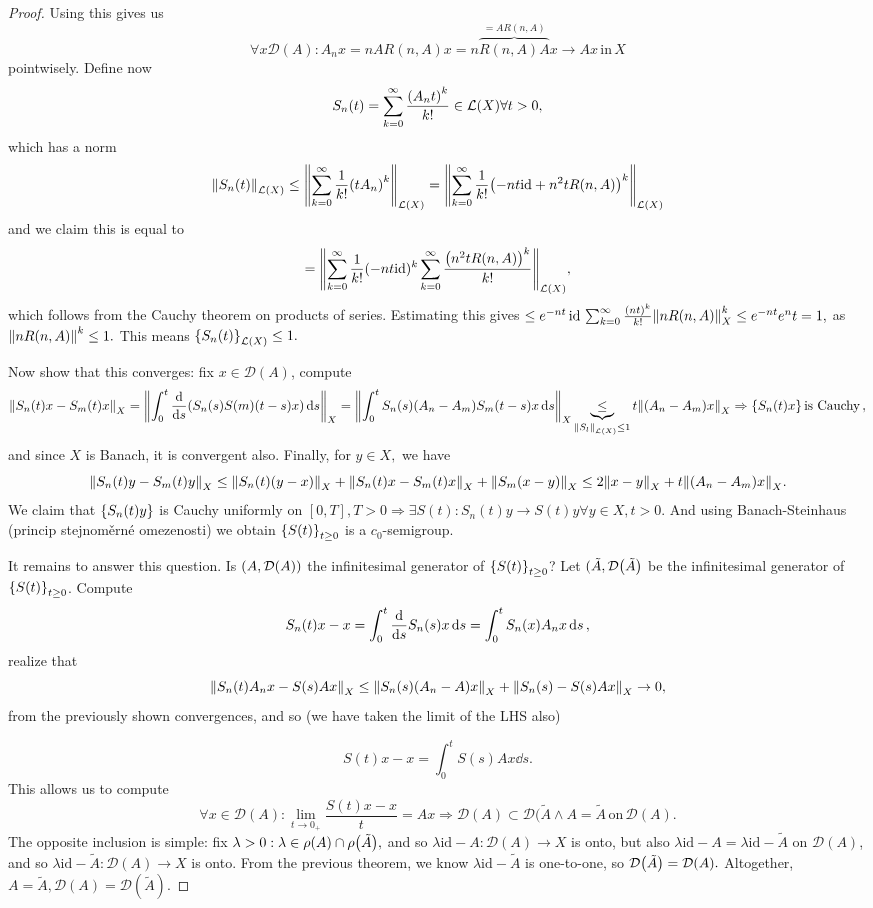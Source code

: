 \documentclass{article}
\begin{document}
\begin{proof}
Using this gives us
\[
	\forall x \mathcal{D}(A): A_n x = n AR(n,A)x = n \overbrace{R(n,A)A}^{=AR(n,A)}x \to Ax \, \text{in} \,X
\]
pointwisely. Define now
\[
	S_n(t) = \sum_{k=0}^{\infty}\frac{\qty(A_n t)^k}{k!} \in \mathcal{L}(X) \forall t>0,
\]
which has a norm
\[
	\norm{S_n(t)}_{\mathcal{L}(X)} \leq \norm{\sum_{k=0}^{\infty}\frac{1}{k!}\qty(tA_n)^k}_{\mathcal{L}(X)} = \norm{\sum_{k=0}^{\infty} \frac{1}{k!}\qty(-n t \text{id} + n^{2} t R(n,A))^k}_{\mathcal{L}(X)}
\]
and we claim this is equal to
\[
	= \norm{\sum_{k=0}^{\infty}\frac{1}{k!}(-n t \text{id})^k \sum_{k=0}^\infty \frac{\qty(n^{2} t R(n,A))^k}{k!}}_{\mathcal{L}(X)},
\]
which follows from the Cauchy theorem on products of series. Estimating this gives $ \leq e^{-nt}\, \text{id} \, \sum_{k=0}^{\infty}\frac{\qty(nt)^k}{k!}\norm{nR(n,A)}^k_X \leq e^{-nt} e^nt = 1,$ as $\norm{nR(n,A)}^k \leq 1.$ This means $\qty{S_n(t)}_{\mathcal{L}(X)} \leq 1.$

Now show that this converges: fix $x \in \mathcal{D}(A)$, compute
\[
	\norm{S_n(t)x - S_m(t)x}_X = \norm{\int_0^t \dv{s} \qty(S_n(s) S(m)(t-s)x)\dd{s}}_X = \norm{\int_0^t S_n(s)(A_n - A_m)S_m(t-s)x \dd{s}}_X \underbrace{\leq}_{\norm{S_l}_{\mathcal{L}(X)}\leq 1} t\norm{(A_n - A_m)x}_X \Rightarrow \qty{S_n(t)x} \, \text{is Cauchy} \,,
\]
and since $X$ is Banach, it is convergent also. Finally, for $y \in X,$ we have
\[
	\norm{S_n(t)y - S_m(t)y}_X \leq \norm{S_n(t)(y-x)}_X + \norm{S_n(t)x - S_m(t)x}_X + \norm{S_m(x-y)}_X \leq 2 \norm{x-y}_X + t\norm{(A_n - A_m)x}_X.
\]
We claim that $\qty{S_n(t)y}$ is Cauchy uniformly on $[0,T], T > 0 \Rightarrow \exists S(t): S_n(t)y \to S(t)y \forall y \in X, t>0.$ And using Banach-Steinhaus (princip stejnoměrné omezenosti) we obtain $\qty{S(t)}_{t\geq 0}$ is a $c_0$-semigroup.

It remains to answer this question. Is $\qty(A, \mathcal{D}(A))$ the infinitesimal generator of $\qty{S(t)}_{t\geq 0}$? Let $(\tilde{A}, \mathcal{D}\qty(\tilde{A})$ be the infinitesimal generator of $\qty{S(t)}_{t\geq 0}$. Compute
\[
	S_n(t)x - x = \int_0^t \dv{s} S_n(s) x \dd{s} = \int_0^t S_n(x)A_n x \dd{s},
\]
realize that
\[
	\norm{S_n(t) A_n x - S(s) A x}_X \leq \norm{S_n(s)(A_n - A)x}_X + \norm{S_n(s)-S(s)Ax}_X \to 0,
\]
from the previously shown convergences, and so (we have taken the limit of the LHS also)

\[
	S(t)x -x = \int_0^t S(s)Ax \dd{s}.
\]
This allows us to compute
\[
	\forall x \in \mathcal{D}(A): \lim_{t\to 0_+}\frac{S(t)x- x}{t} = Ax \Rightarrow \mathcal{D}(A) \subset \mathcal{D}(\tilde{A} \wedge A = \tilde{A} \, \text{on} \, \mathcal{D}(A).
\]
The opposite inclusion is simple: fix $\lambda >0: \lambda \in \rho(A) \cap \rho\qty(\tilde{A}),$ and so $\lambda \text{id} - A: \mathcal{D}(A) \to X$ is onto, but also $\lambda \text{id} - A = \lambda \text{id} - \tilde{A}$ on $\mathcal{D}(A)$, and so $\lambda \text{id}-\tilde{A}: \mathcal{D}(A) \to X$ is onto. From the previous theorem, we know $\lambda \text{id} - \tilde{A}$ is one-to-one, so $\mathcal{D}\qty(\tilde{A}) = \mathcal{D}(A).$ Altogether, $A = \tilde{A}, \mathcal{D}(A) = \mathcal{D}(\tilde{A}).$


\end{proof}
\end{document}
